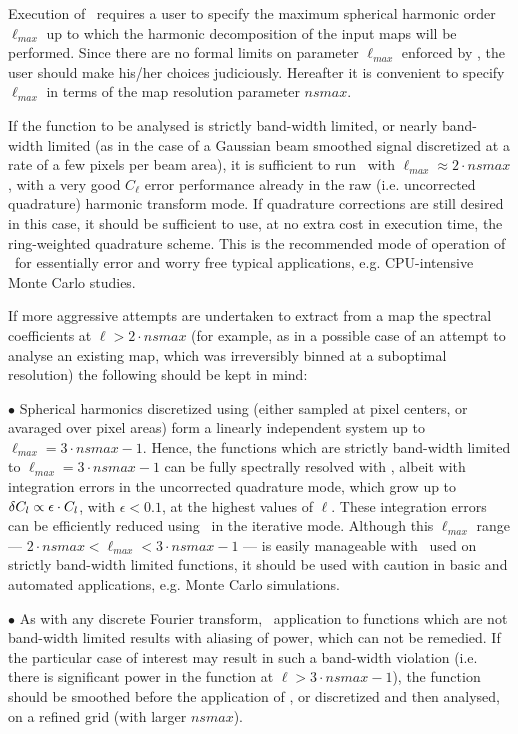 \begin{recommend}
{Execution of \thedocid\ requires a user to specify the maximum 
spherical harmonic order $\ell_{max}$ up to which the harmonic 
decomposition of the input maps will be performed.
Since there are no formal limits on parameter
$\ell_{max}$ enforced by \thedocid, the user should make his/her choices
judiciously. 
Hereafter it is convenient to specify $\ell_{max}$  
in terms of the \healpix
map resolution parameter $nsmax$.

If the function to be analysed is strictly  band-width
limited, or nearly band-width limited (as in the case of 
a Gaussian beam smoothed signal discretized at a rate of a few pixels
per beam area), it is  sufficient to run \thedocid\ with
$\ell_{max} \approx 2\cdot nsmax$, with a very good $C_\ell$ 
error performance 
already in the raw (i.e. uncorrected quadrature) harmonic transform mode. 
If quadrature 
corrections are still desired in this case, it should be sufficient to use, at no
extra cost in execution time, the ring-weighted quadrature scheme. 
This is the recommended mode of operation of \thedocid\ for essentially
error and worry free typical applications, e.g. CPU-intensive 
Monte Carlo studies. 

If more aggressive attempts are undertaken to extract from a map 
the spectral coefficients at $\ell > 2\cdot nsmax$ (for example, as 
in a possible case of an attempt to analyse an existing map, which was 
irreversibly binned  at a suboptimal resolution) 
the following should be kept in mind:

$\bullet$ Spherical harmonics discretized using \healpix 
(either sampled at
pixel centers, or avaraged over pixel areas) form a linearly independent
system up to $\ell_{max} = 3 \cdot nsmax -1$. Hence, the functions which are
strictly band-width limited to $\ell_{max} = 3 \cdot nsmax - 1 $ 
can be fully
spectrally resolved with \thedocid, albeit with integration errors
in the uncorrected quadrature mode, which grow up to 
$\delta C_l \propto \epsilon \cdot C_l$, with $\epsilon <0.1$, 
at the highest values of $\ell$. These integration  errors 
can be efficiently 
reduced
using \thedocid\ in the iterative mode. Although this $\ell_{max}$ range
--- $2 \cdot nsmax < \ell_{max} < 3 \cdot nsmax - 1$ --- is easily
manageable with \thedocid\ used on strictly band-width limited functions,
it should be used with caution in basic and automated applications, e.g.
Monte Carlo simulations.

$\bullet$ As with any discrete Fourier transform, \thedocid\ application to
functions which are not band-width limited results with aliasing
of power, which can not be remedied. If the particular case of interest
may result in such a band-width violation (i.e. there is significant power
in the function at $\ell > 3 \cdot nsmax -1$), the function should
be smoothed before the application of \thedocid, or discretized and
then analysed, on a refined \healpix grid (with larger $nsmax$).

}
\end{recommend}
